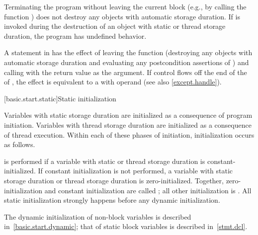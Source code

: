\pnum
{}%
%
%
Terminating the program
without leaving the current block (e.g., by calling the function
) does not destroy any
objects with automatic storage duration. If
 is invoked during the destruction of
an object with static or thread storage duration, the program has undefined
behavior.

\pnum
{}%
%
A  statement in  has the effect of leaving the 
function (destroying any objects with automatic storage duration
and evaluating any postcondition assertions of )
and calling  with the return value as the argument.
If control flows off the end of
the  of ,
the effect is equivalent to a  with operand 
(see also \ref{except.handle}).

[basic.start.static]{Static initialization}

\pnum
{}%
%
Variables with static storage duration
are initialized as a consequence of program initiation. Variables with
thread storage duration are initialized as a consequence of thread execution.
Within each of these phases of initiation, initialization occurs as follows.

\pnum
{}%
 is performed
if a variable with static or thread storage duration
is constant-initialized.
%
If constant initialization is not performed, a variable with static
storage duration or thread storage
duration is zero-initialized.
Together, zero-initialization and constant initialization are called
;
all other initialization is .
All static initialization strongly happens before
any dynamic initialization.
\begin{note}
The dynamic initialization of non-block variables is described
in~\ref{basic.start.dynamic}; that of static block variables is described
in~\ref{stmt.dcl}.
\end{note}


